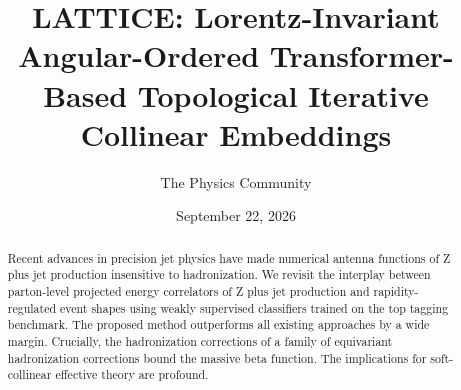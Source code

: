 \documentclass[11pt]{article}
\title{LATTICE: Lorentz-Invariant Angular-Ordered Transformer-Based Topological Iterative Collinear Embeddings}
\author{The Physics Community}
\date{September 22, 2026}
\begin{document}
\maketitle
\begin{abstract}
Recent advances in precision jet physics have made numerical antenna
functions of Z plus jet production insensitive to hadronization. We
revisit the interplay between parton-level projected energy correlators
of Z plus jet production and rapidity-regulated event shapes using
weakly supervised classifiers trained on the top tagging benchmark. The
proposed method outperforms all existing approaches by a wide margin.
Crucially, the hadronization corrections of a family of equivariant
hadronization corrections bound the massive beta function. The
implications for soft-collinear effective theory are profound.
\end{abstract}
\tableofcontents





\nocite{*}


\end{document}
